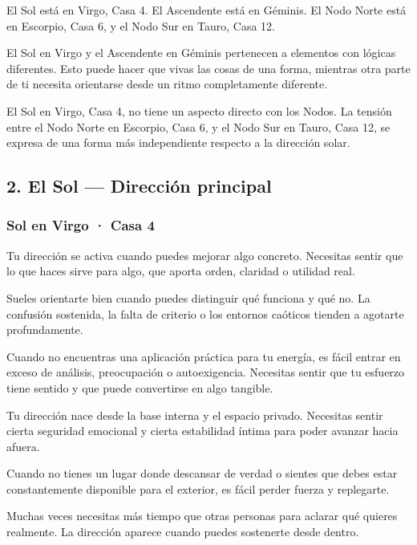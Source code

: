 \documentclass[11pt,a4paper]{article}
\begin{document}
El Sol está en Virgo, Casa 4. El Ascendente está en Géminis. El Nodo Norte está en Escorpio, Casa 6, y el Nodo Sur en Tauro, Casa 12.

El Sol en Virgo y el Ascendente en Géminis pertenecen a elementos con lógicas diferentes. Esto puede hacer que vivas las cosas de una forma, mientras otra parte de ti necesita orientarse desde un ritmo completamente diferente.

El Sol en Virgo, Casa 4, no tiene un aspecto directo con los Nodos. La tensión entre el Nodo Norte en Escorpio, Casa 6, y el Nodo Sur en Tauro, Casa 12, se expresa de una forma más independiente respecto a la dirección solar.

\vspace{0.5cm}


\subsection{2. El Sol — Dirección principal}

\subsubsection*{Sol en Virgo · Casa 4}

Tu dirección se activa cuando puedes mejorar algo concreto. Necesitas sentir que lo que haces sirve para algo, que aporta orden, claridad o utilidad real.

Sueles orientarte bien cuando puedes distinguir qué funciona y qué no. La confusión sostenida, la falta de criterio o los entornos caóticos tienden a agotarte profundamente.

Cuando no encuentras una aplicación práctica para tu energía, es fácil entrar en exceso de análisis, preocupación o autoexigencia. Necesitas sentir que tu esfuerzo tiene sentido y que puede convertirse en algo tangible.

Tu dirección nace desde la base interna y el espacio privado. Necesitas sentir cierta seguridad emocional y cierta estabilidad íntima para poder avanzar hacia afuera.

Cuando no tienes un lugar donde descansar de verdad o sientes que debes estar constantemente disponible para el exterior, es fácil perder fuerza y replegarte.

Muchas veces necesitas más tiempo que otras personas para aclarar qué quieres realmente. La dirección aparece cuando puedes sostenerte desde dentro.
\end{document}
